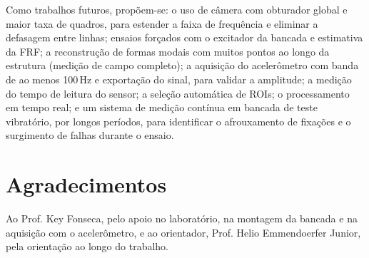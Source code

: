 \documentclass[a4paper,10pt,twocolumn]{article}
\begin{document}
Como trabalhos futuros, propõem-se: o uso de câmera com obturador global e maior taxa de quadros, para estender a faixa de frequência e eliminar a defasagem entre linhas; ensaios forçados com o excitador da bancada e estimativa da FRF; a reconstrução de formas modais com muitos pontos ao longo da estrutura (medição de campo completo); a aquisição do acelerômetro com banda de ao menos 100\,Hz e exportação do sinal, para validar a amplitude; a medição do tempo de leitura do sensor; a seleção automática de ROIs; o processamento em tempo real; e um sistema de medição contínua em bancada de teste vibratório, por longos períodos, para identificar o afrouxamento de fixações e o surgimento de falhas durante o ensaio.

\section*{Agradecimentos}

Ao Prof. Key Fonseca, pelo apoio no laboratório, na montagem da bancada e na aquisição com o acelerômetro, e ao orientador, Prof. Helio Emmendoerfer Junior, pela orientação ao longo do trabalho.



\end{document}
